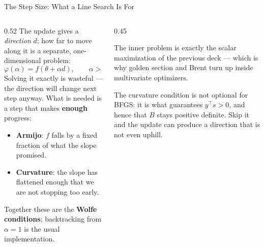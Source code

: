 \begin{frame}{The Step Size: What a Line Search Is For}
\begin{columns}[T]
\begin{column}{0.52\textwidth}
\small
The update gives a \emph{direction} $d$; how far to move along it is a separate, one-dimensional problem:
\[
  \varphi(\alpha)=f(\theta+\alpha d), \qquad \alpha>0 .
\]
Solving it exactly is wasteful --- the direction will change next step anyway. What is needed is a step that makes \textbf{enough} progress:
\begin{itemize}\footnotesize
  \item \textbf{Armijo}: $f$ falls by a fixed fraction of what the slope promised.
  \item \textbf{Curvature}: the slope has flattened enough that we are not stopping too early.
\end{itemize}
Together these are the \textbf{Wolfe conditions}; backtracking from $\alpha=1$ is the usual implementation.
\end{column}
\begin{column}{0.45\textwidth}
\begin{conceptbox}[title=\textbf{This is 4.A2, nested}]\small
The inner problem is exactly the scalar maximization of the previous deck --- which is why golden section and Brent turn up inside multivariate optimizers.
\end{conceptbox}
\medskip
\begin{cautionbox}\footnotesize
The curvature condition is not optional for BFGS: it is what guarantees $y^{\!\top}s>0$, and hence that $B$ stays positive definite. Skip it and the update can produce a direction that is not even uphill.
\end{cautionbox}
\end{column}
\end{columns}
\vspace{1mm}
\end{frame}

